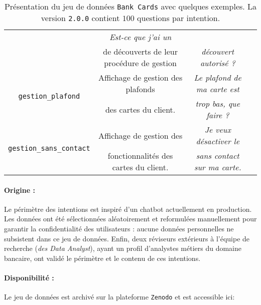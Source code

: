 \begin{table}[!htb]
\begin{center}
\begin{scriptsize}
\begin{tabular}{|c|c|c|c|}
					& \textit{Est-ce que j'ai un}
					\tabularnewline
					& de découverts de leur procédure de gestion
					& \textit{découvert autorisé ?}
					\tabularnewline
					\hline
				\multirow{2}{*}{\texttt{gestion\_plafond}}
					& Affichage de gestion des plafonds
					& \textit{Le plafond de ma carte est}
					\tabularnewline
					& des cartes du client.
					& \textit{trop bas, que faire ?}
					\tabularnewline
					\hline
				\multirow{2}{*}{\texttt{gestion\_sans\_contact}}
					& Affichage de gestion des
					& \textit{Je veux désactiver le}
					\tabularnewline
					& fonctionnalités des cartes du client.
					& \textit{sans contact sur ma carte.}
					\tabularnewline
					\hline
			\end{tabular}
			\end{scriptsize}
			\end{center}
			\caption{
				Présentation du jeu de données \texttt{Bank Cards} avec quelques exemples.
				La version \texttt{2.0.0} contient $100$ questions par intention.
			}
			\label{table:A.1-DATASET-BANK-CARDS}
		\end{table}
		
		\paragraph{Origine :}
		Le périmètre des intentions est inspiré d'un chatbot actuellement en production.
		Les données ont été sélectionnées aléatoirement et reformulées manuellement pour garantir la confidentialité des utilisateurs : aucune données personnelles ne subsistent dans ce jeu de données.
		Enfin, deux réviseurs extérieurs à l'équipe de recherche (\textit{des Data Analyst}), ayant un profil d'analystes métiers du domaine bancaire, ont validé le périmètre et le contenu de ces intentions.
		
		\paragraph{Disponibilité :}
		Le jeu de données est archivé sur la plateforme \texttt{Zenodo} et est accessible ici: \cite{schild:2022:french-trainset-chatbots}


	\newpage
